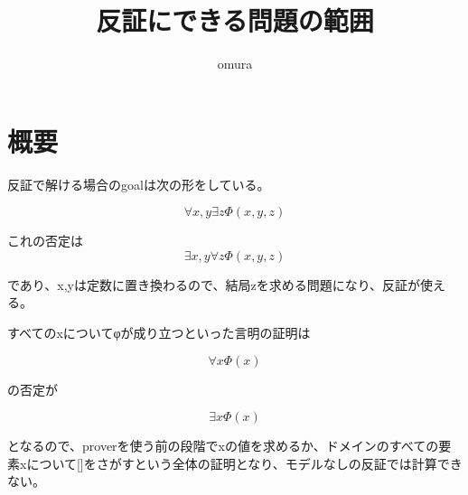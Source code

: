 \documentclass[10pt, oneside]{jarticle}   	%
\title{反証にできる問題の範囲}
\author{omura}
\theoremstyle{definition}
\begin{document}
\maketitle

\section{概要}
反証で解ける場合のgoalは次の形をしている。

$$\forall x,y \exists z \Phi (x,y,z) $$ 

これの否定は
$$\exists  x,y \forall z \Phi (x,y,z) $$ 

であり、x,yは定数に置き換わるので、結局zを求める問題になり、反証が使える。

すべてのxについてφが成り立つといった言明の証明は

$$\forall x \Phi (x) $$ 

の否定が

$$\exists x \Phi (x) $$ 

となるので、proverを使う前の段階でxの値を求めるか、ドメインのすべての要素xについて[]をさがすという全体の証明となり、モデルなしの反証では計算できない。
\end{document}
